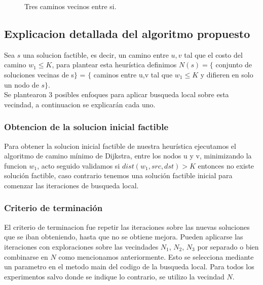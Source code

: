 \begin{figure}[H]
\centering
{}
\caption{Tres caminos vecinos entre si.}
\end{figure}

\subsection{Explicacion detallada del algoritmo propuesto}
Sea $s$ una solucion factible, es decir, un camino entre $u,v$ tal que el costo del camino $w_1 \leq K$,
para plantear esta heur\'istica definimos $N(s) = \{ $ conjunto de soluciones vecinas de s$\}$ = $\{$ caminos entre u,v tal que $w_1 \leq K$ y difieren en solo un nodo de $s\}$.\\

Se plantearon 3 posibles enfoques para aplicar busqueda local sobre esta vecindad, a continuacion se explicar\'an cada uno.

\subsubsection{Obtencion de la solucion inicial factible}

Para obtener la solucion inicial factible de nuestra heur\'istica ejecutamos el algoritmo de camino m\'inimo de Dijkstra, entre los nodos u y v, minimizando la funcion $w_1$, acto seguido validamos si $dist(w_1, src, dst) > K$ entonces no existe soluci\'on factible, caso contrario tenemos una soluci\'on factible inicial para comenzar las 
iteraciones de busqueda local.

\subsubsection{Criterio de terminaci\'on}
El criterio de terminacion fue repetir las iteraciones sobre las nuevas soluciones que se iban obteniendo, hasta que no se obtiene mejora.
Pueden aplicarse las iteraciones con exploraciones sobre las vecindades $N_1$, $N_2$, $N_3$ por separado o bien combinarse en $N$ como mencionamos anteriormente. Esto se selecciona mediante un parametro en el metodo main del codigo de la busqueda local. Para todos los experimentos salvo donde se indique lo contrario, se utilizo la vecindad $N$.

